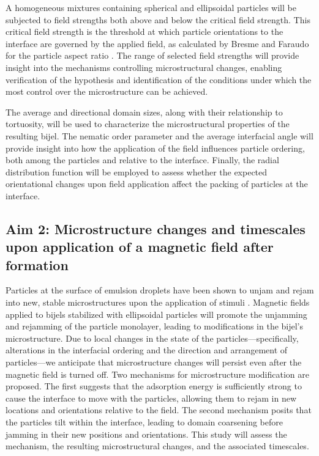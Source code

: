 A homogeneous mixtures containing spherical and ellipsoidal particles will be subjected to field strengths both above and below the critical field strength. 
This critical field strength is the threshold 
at which particle orientations to the interface are governed by the applied field, as calculated by Bresme and Faraudo for the particle aspect ratio 
\cite{bresme_orientational_2007, davies_interface_2014}. The range of selected field strengths will provide insight into the mechanisms controlling 
microstructural changes, enabling verification of the hypothesis and identification of the conditions under which the most control over the microstructure 
can be achieved.

The average and directional domain sizes, along with their relationship to tortuosity, will be used to characterize the microstructural properties of the 
resulting bijel. The nematic order parameter and the average interfacial angle will provide insight into how the application of the field influences particle 
ordering, both among the particles and relative to the interface. Finally, the radial distribution function will be employed to assess whether the expected 
orientational changes upon field application affect the packing of particles at the interface.

\subsection{Aim 2: Microstructure changes and timescales upon application of a magnetic field after formation}
\label{section:aim2_desc}

Particles at the surface of emulsion droplets have been shown to unjam and rejam into new, stable microstructures upon the application of stimuli 
\cite{cui_stabilizing_2013}. Magnetic fields applied to bijels stabilized with ellipsoidal particles will promote the unjamming and rejamming of the 
particle monolayer, leading to modifications in the bijel's microstructure. Due to local changes in the state of the particles—specifically, alterations 
in the interfacial ordering and the direction and arrangement of particles—we anticipate that microstructure changes will persist even after the magnetic 
field is turned off. Two mechanisms for microstructure modification are proposed. The first suggests that the adsorption energy is sufficiently strong to 
cause the interface to move with the particles, allowing them to rejam in new locations and orientations relative to the field. The second mechanism posits 
that the particles tilt within the interface, leading to domain coarsening before jamming in their new positions and orientations. This study will assess the 
mechanism, the resulting microstructural changes, and the associated timescales.

